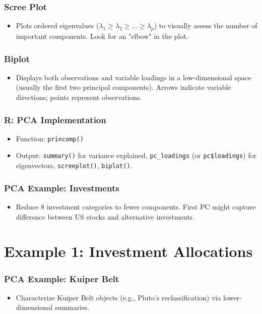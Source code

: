 \documentclass{beamer}
\newcommand{\code}[1]{\texttt{#1}}
\begin{document}
\begin{frame}
    \frametitle{Scree Plot}
    \begin{itemize}
        \item Plots ordered eigenvalues ($\lambda_1 \ge \lambda_2 \ge \dots \ge \lambda_p$) to visually assess the number of important components. Look for an "elbow" in the plot.
    \end{itemize}
\end{frame}

\begin{frame}
    \frametitle{Biplot}
    \begin{itemize}
        \item Displays both observations and variable loadings in a low-dimensional space (usually the first two principal components). Arrows indicate variable directions; points represent observations.
    \end{itemize}
\end{frame}

\begin{frame}
    \frametitle{R: PCA Implementation}
    \begin{itemize}
        \item Function: \code{princomp()}
        \item Output: \code{summary()} for variance explained, \texttt{pc\_loadings} (or \code{pc\$loadings}) for eigenvectors, \code{screeplot()}, \code{biplot()}.
    \end{itemize}
\end{frame}

\begin{frame}
    \frametitle{PCA Example: Investments}
    \begin{itemize}
        \item Reduce 8 investment categories to fewer components. First PC might capture difference between US stocks and alternative investments.
    \end{itemize}
\end{frame}

\section{Example 1: Investment Allocations}

\begin{frame}
    \frametitle{PCA Example: Kuiper Belt}
    \begin{itemize}
        \item Characterize Kuiper Belt objects (e.g., Pluto's reclassification) via lower-dimensional summaries.
    \end{itemize}
\end{frame}
\end{document}

